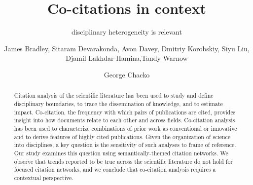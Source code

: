 \documentclass[NETN]{stjour}
\begin{document}
\title[Co-citations in context]{Co-citations in context}
\subtitle{disciplinary heterogeneity is relevant}



\author[Author Names]
{James Bradley,
Sitaram Devarakonda, Avon Davey, Dmitriy Korobskiy, Siyu Liu, Djamil Lakhdar-Hamina,Tandy Warnow
\and George Chacko}










\begin{abstract}
Citation analysis of the scientific literature has been used to study and define disciplinary boundaries, to trace the dissemination of knowledge, and to estimate impact. Co-citation, the frequency with which pairs of publications are cited, provides insight into how documents relate to each other and across fields. Co-citation analysis has been used to characterize combinations of prior work as conventional or innovative and to derive features of highly cited publications. Given the organization of science into disciplines, a key question is the sensitivity of such analyses to frame of reference. Our study examines this question using  semantically-themed citation networks. We observe that trends reported to be true across the scientific literature do not hold for focused citation networks, and we conclude that co-citation analysis requires a contextual perspective.
\end{abstract}
\end{document}

